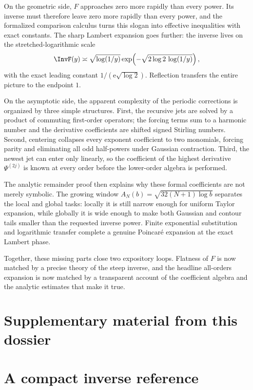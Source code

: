 \documentclass[11pt,oneside]{article}
\theoremstyle{definition}
\theoremstyle{remark}
\newcommand{\e}{\mathrm e}
\begin{document}
On the geometric side, $F$ approaches zero more rapidly than every
power.  Its inverse must therefore leave zero more rapidly than every
power, and the formalized comparison calculus turns this slogan into
effective inequalities with exact constants.  The sharp Lambert
expansion goes further: the inverse lives on the
stretched-logarithmic scale
\[
 \InvF(y)\asymp
 \sqrt{\log(1/y)}
 \exp\!\left(-\sqrt{2\log2\,\log(1/y)}\right),
\]
with the exact leading constant $1/(\e\sqrt{\log2})$.  Reflection transfers
the entire picture to the endpoint $1$.

On the asymptotic side, the apparent complexity of the periodic
corrections is organized by three simple structures.  First, the
recursive jets are solved by a product of commuting first-order
operators; the forcing terms sum to a harmonic number and the derivative
coefficients are shifted signed Stirling numbers.  Second, centering
collapses every exponent coefficient to two monomials, forcing parity and
eliminating all odd half-powers under Gaussian contraction.  Third, the
newest jet can enter only linearly, so the coefficient of the highest
derivative $\Psi^{(2j)}$ is known at every order before the lower-order
algebra is performed.

The analytic remainder proof then explains why these formal coefficients
are not merely symbolic.  The growing window
$A_N(b)=\sqrt{32(N+1)\log b}$ separates the local and global tasks:
locally it is still narrow enough for uniform Taylor expansion, while
globally it is wide enough to make both Gaussian and contour tails smaller
than the requested inverse power.  Finite exponential substitution and
logarithmic transfer complete a genuine Poincar\'e expansion at the exact
Lambert phase.

Together, these missing parts close two expository loops.  Flatness of
$F$ is now matched by a precise theory of the steep inverse, and the
headline all-orders expansion is now matched by a transparent account of
the coefficient algebra and the analytic estimates that make it true.

\clearpage
\section*{Supplementary material from this dossier}
\section{A compact inverse reference}
\label{inverse:app:inverse-reference}
\end{document}
